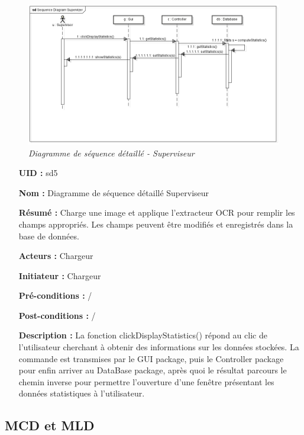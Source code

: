 \begin{figure}[!h]
	\begin{center}
		\includegraphics[scale = 0.6]{img/seqDiagSupervizerDetailled.png}
	\end{center}
	\caption{\it Diagramme de séquence détaillé - Superviseur}
	\label{seqDiagSuperDet}
\end{figure}

\newpage
\begin{itemize}
	\item[{\bf UID :}] sd5
	\item[{\bf Nom :}] Diagramme de séquence détaillé Superviseur
	\item[{\bf Résumé :}]  Charge une image et applique l'extracteur OCR pour remplir les champs appropriés. Les champs peuvent être modifiés et enregistrés dans la base de données.
	\item[{\bf Acteurs :}] Chargeur
	\item[{\bf Initiateur :}] Chargeur
	\item[{\bf Pré-conditions :}]  /
	\item[{\bf Post-conditions :}]  /
	\smallbreak
	\item[{\bf Description :}]
	La fonction clickDisplayStatistics() répond au clic de l'utilisateur cherchant à obtenir des informations sur les données stockées. La commande est transmises par le GUI package, puis le Controller package pour enfin arriver au DataBase package, après quoi le résultat parcours le chemin inverse pour permettre l'ouverture d'une fenêtre présentant les données statistiques à l'utilisateur.
\end{itemize}


\newpage
\subsection{MCD et MLD}

